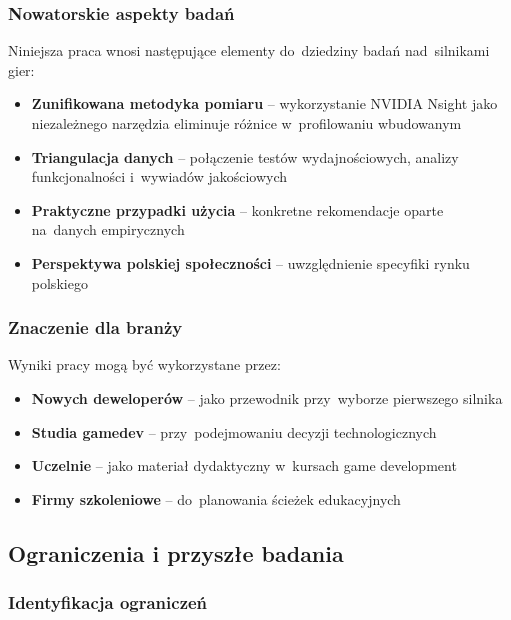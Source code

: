 \subsubsection{Nowatorskie aspekty badań}

Niniejsza praca wnosi następujące elementy do~dziedziny badań nad~silnikami gier:

\begin{itemize}
    \item \textbf{Zunifikowana metodyka pomiaru} -- wykorzystanie NVIDIA Nsight jako niezależnego narzędzia eliminuje różnice w~profilowaniu wbudowanym
    \item \textbf{Triangulacja danych} -- połączenie testów wydajnościowych, analizy funkcjonalności i~wywiadów jakościowych
    \item \textbf{Praktyczne przypadki użycia} -- konkretne rekomendacje oparte na~danych empirycznych
    \item \textbf{Perspektywa polskiej społeczności} -- uwzględnienie specyfiki rynku polskiego
\end{itemize}

\subsubsection{Znaczenie dla branży}

Wyniki pracy mogą być wykorzystane przez:

\begin{itemize}
    \item \textbf{Nowych deweloperów} -- jako przewodnik przy~wyborze pierwszego silnika
    \item \textbf{Studia gamedev} -- przy~podejmowaniu decyzji technologicznych
    \item \textbf{Uczelnie} -- jako materiał dydaktyczny w~kursach game development
    \item \textbf{Firmy szkoleniowe} -- do~planowania ścieżek edukacyjnych
\end{itemize}

\subsection{Ograniczenia i przyszłe badania}

\subsubsection{Identyfikacja ograniczeń}

